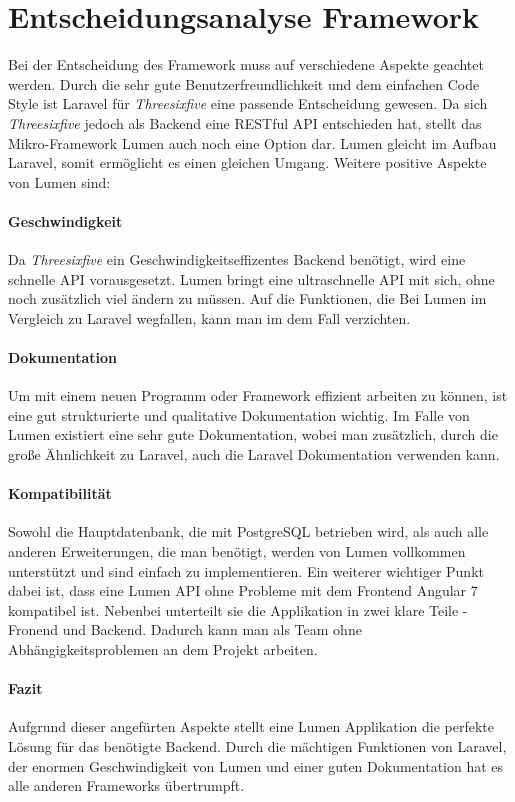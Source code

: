 \section{Entscheidungsanalyse Framework}

Bei der Entscheidung des Framework muss auf verschiedene Aspekte geachtet werden. Durch die sehr gute Benutzerfreundlichkeit und dem einfachen Code Style ist Laravel für \textit{Threesixfive} eine passende Entscheidung gewesen. Da sich \textit{Threesixfive} jedoch als Backend eine RESTful API entschieden hat, stellt das Mikro-Framework Lumen auch noch eine Option dar. Lumen gleicht im Aufbau Laravel, somit ermöglicht es einen gleichen Umgang. Weitere positive Aspekte von Lumen sind:

\paragraph{Geschwindigkeit}

Da \textit{Threesixfive} ein Geschwindigkeitseffizentes Backend benötigt, wird eine schnelle API vorausgesetzt. Lumen bringt eine ultraschnelle API mit sich, ohne noch zusätzlich viel ändern zu müssen. Auf die Funktionen, die Bei Lumen im Vergleich zu Laravel wegfallen, kann man im dem Fall verzichten.

\paragraph{Dokumentation}

Um mit einem neuen Programm oder Framework effizient arbeiten zu können, ist eine gut strukturierte und qualitative Dokumentation wichtig. Im Falle von Lumen existiert eine sehr gute Dokumentation, wobei man zusätzlich, durch die große Ähnlichkeit zu Laravel, auch die Laravel Dokumentation verwenden kann.

\paragraph{Kompatibilität}

Sowohl die Hauptdatenbank, die mit PostgreSQL betrieben wird, als auch alle anderen Erweiterungen, die man benötigt, werden von Lumen vollkommen unterstützt und sind einfach zu implementieren. Ein weiterer wichtiger Punkt dabei ist, dass eine Lumen API ohne Probleme mit dem Frontend Angular 7 kompatibel ist. Nebenbei unterteilt sie die Applikation in zwei klare Teile - Fronend und Backend. Dadurch kann man als Team ohne Abhängigkeitsproblemen an dem Projekt arbeiten.

\paragraph{Fazit}

Aufgrund dieser angefürten Aspekte stellt eine Lumen Applikation die perfekte Lösung für das benötigte Backend. Durch die mächtigen Funktionen von Laravel, der enormen Geschwindigkeit von Lumen und einer guten Dokumentation hat es alle anderen Frameworks übertrumpft.

